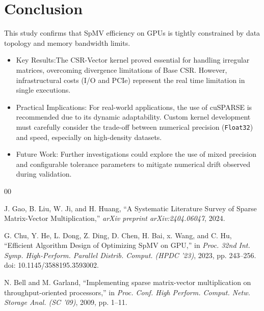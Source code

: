 \documentclass[conference]{IEEEtran}
\begin{document}
\section{Conclusion}

This study confirms that SpMV efficiency on GPUs is tightly constrained by data topology and memory bandwidth limits.

\begin{itemize}

    \item Key Results:The CSR-Vector kernel proved essential for handling irregular matrices, overcoming divergence limitations of Base CSR. However, infrastructural costs (I/O and PCIe) represent the real time limitation in single executions.

    \item Practical Implications: For real-world applications, the use of cuSPARSE is recommended due to its dynamic adaptability. Custom kernel development must carefully consider the trade-off between numerical precision (\texttt{Float32}) and speed, especially on high-density datasets.

    \item Future Work: Further investigations could explore the use of mixed precision and configurable tolerance parameters to mitigate numerical drift observed during validation.

\end{itemize}


\begin{thebibliography}{00}

 J. Gao, B. Liu, W. Ji, and H. Huang, ``A Systematic Literature Survey of Sparse Matrix-Vector Multiplication,'' \textit{arXiv preprint arXiv:2404.06047}, 2024.

 G. Chu, Y. He, L. Dong, Z. Ding, D. Chen, H. Bai, x. Wang, and C. Hu, ``Efficient Algorithm Design of Optimizing SpMV on GPU,'' in \textit{Proc. 32nd Int. Symp. High-Perform. Parallel Distrib. Comput. (HPDC '23)}, 2023, pp. 243–256. doi: 10.1145/3588195.3593002.

 N. Bell and M. Garland, ``Implementing sparse matrix-vector multiplication on throughput-oriented processors,'' in \textit{Proc. Conf. High Perform. Comput. Netw. Storage Anal. (SC '09)}, 2009, pp. 1–11.


\end{thebibliography}
\end{document}
